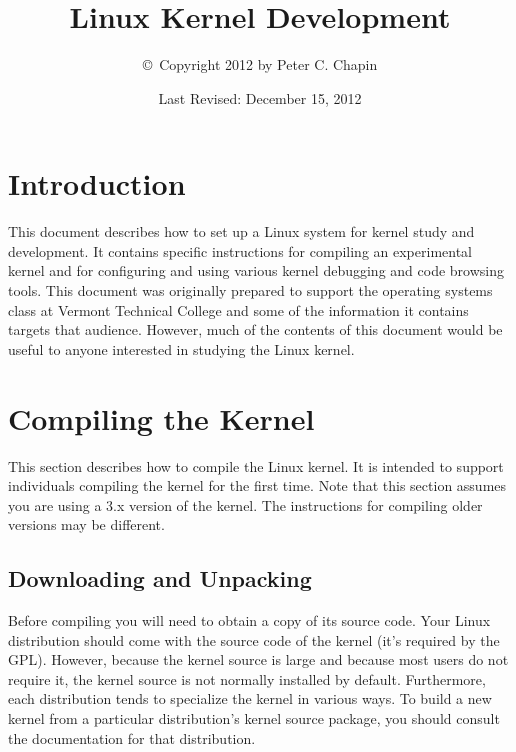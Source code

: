 \documentclass{article}
\begin{document}
\title{Linux Kernel Development}
\author{\copyright\ Copyright 2012 by Peter C. Chapin}
\date{Last Revised: December 15, 2012}
\maketitle

\tableofcontents
\newpage
{}

\section{Introduction}

This document describes how to set up a Linux system for kernel study and development. It
contains specific instructions for compiling an experimental kernel and for configuring and
using various kernel debugging and code browsing tools. This document was originally prepared to
support the operating systems class at Vermont Technical College and some of the information it
contains targets that audience. However, much of the contents of this document would be useful
to anyone interested in studying the Linux kernel.

\section{Compiling the Kernel}

This section describes how to compile the Linux kernel. It is intended to support individuals
compiling the kernel for the first time. Note that this section assumes you are using a 3.x
version of the kernel. The instructions for compiling older versions may be different.

\subsection{Downloading and Unpacking}

Before compiling you will need to obtain a copy of its source code. Your Linux distribution
should come with the source code of the kernel (it's required by the GPL). However, because the
kernel source is large and because most users do not require it, the kernel source is not
normally installed by default. Furthermore, each distribution tends to specialize the kernel in
various ways. To build a new kernel from a particular distribution's kernel source package, you
should consult the documentation for that distribution.
\end{document}
